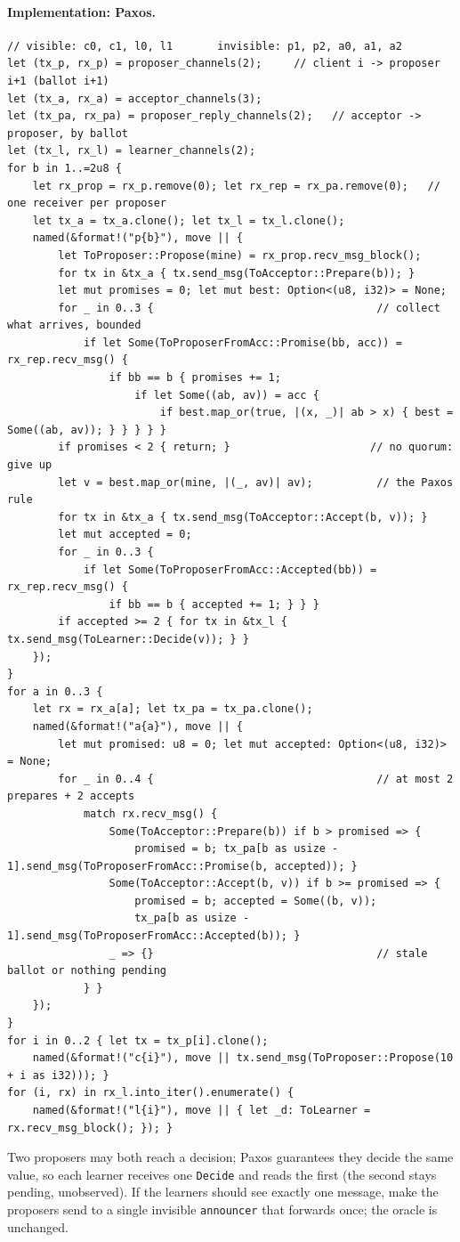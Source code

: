 \documentclass[11pt,a4paper]{article}
\newcommand{\code}[1]{\texttt{#1}}
\begin{document}
\paragraph{Implementation: Paxos.}
\begin{lstlisting}
// visible: c0, c1, l0, l1       invisible: p1, p2, a0, a1, a2
let (tx_p, rx_p) = proposer_channels(2);     // client i -> proposer i+1 (ballot i+1)
let (tx_a, rx_a) = acceptor_channels(3);
let (tx_pa, rx_pa) = proposer_reply_channels(2);   // acceptor -> proposer, by ballot
let (tx_l, rx_l) = learner_channels(2);
for b in 1..=2u8 {
    let rx_prop = rx_p.remove(0); let rx_rep = rx_pa.remove(0);   // one receiver per proposer
    let tx_a = tx_a.clone(); let tx_l = tx_l.clone();
    named(&format!("p{b}"), move || {
        let ToProposer::Propose(mine) = rx_prop.recv_msg_block();
        for tx in &tx_a { tx.send_msg(ToAcceptor::Prepare(b)); }
        let mut promises = 0; let mut best: Option<(u8, i32)> = None;
        for _ in 0..3 {                                   // collect what arrives, bounded
            if let Some(ToProposerFromAcc::Promise(bb, acc)) = rx_rep.recv_msg() {
                if bb == b { promises += 1;
                    if let Some((ab, av)) = acc {
                        if best.map_or(true, |(x, _)| ab > x) { best = Some((ab, av)); } } } } }
        if promises < 2 { return; }                      // no quorum: give up
        let v = best.map_or(mine, |(_, av)| av);          // the Paxos rule
        for tx in &tx_a { tx.send_msg(ToAcceptor::Accept(b, v)); }
        let mut accepted = 0;
        for _ in 0..3 {
            if let Some(ToProposerFromAcc::Accepted(bb)) = rx_rep.recv_msg() {
                if bb == b { accepted += 1; } } }
        if accepted >= 2 { for tx in &tx_l { tx.send_msg(ToLearner::Decide(v)); } }
    });
}
for a in 0..3 {
    let rx = rx_a[a]; let tx_pa = tx_pa.clone();
    named(&format!("a{a}"), move || {
        let mut promised: u8 = 0; let mut accepted: Option<(u8, i32)> = None;
        for _ in 0..4 {                                   // at most 2 prepares + 2 accepts
            match rx.recv_msg() {
                Some(ToAcceptor::Prepare(b)) if b > promised => {
                    promised = b; tx_pa[b as usize - 1].send_msg(ToProposerFromAcc::Promise(b, accepted)); }
                Some(ToAcceptor::Accept(b, v)) if b >= promised => {
                    promised = b; accepted = Some((b, v));
                    tx_pa[b as usize - 1].send_msg(ToProposerFromAcc::Accepted(b)); }
                _ => {}                                   // stale ballot or nothing pending
            } }
    });
}
for i in 0..2 { let tx = tx_p[i].clone();
    named(&format!("c{i}"), move || tx.send_msg(ToProposer::Propose(10 + i as i32))); }
for (i, rx) in rx_l.into_iter().enumerate() {
    named(&format!("l{i}"), move || { let _d: ToLearner = rx.recv_msg_block(); }); }
\end{lstlisting}
Two proposers may both reach a decision; Paxos guarantees they decide the same value, so each
learner receives one \code{Decide} and reads the first (the second stays pending, unobserved).
If the learners should see exactly one message, make the proposers send to a single invisible
\code{announcer} that forwards once; the oracle is unchanged.
\end{document}
